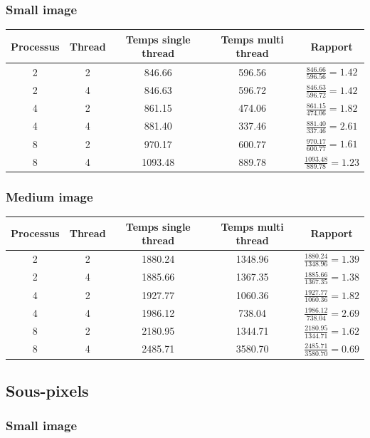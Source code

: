 \documentclass{article}
\begin{document}
\subsubsection{Small image}

\begin{tabular}{ | c | c | c | c | c | }
  \hline
  Processus & Thread & Temps single thread & Temps multi thread & Rapport \\
  \hline
  2 & 2 & 846.66 & 596.56 & $ \frac{846.66}{596.56} = 1.42 $ \\
  2 & 4 & 846.63 & 596.72 & $ \frac{846.63}{596.72} = 1.42 $ \\
  4 & 2 & 861.15 & 474.06 & $ \frac{861.15}{474.06} = 1.82 $ \\
  4 & 4 & 881.40 & 337.46 & $ \frac{881.40}{337.46} = 2.61 $ \\
  8 & 2 & 970.17 & 600.77 & $ \frac{970.17}{600.77} = 1.61 $ \\
  8 & 4 & 1093.48 & 889.78 & $ \frac{1093.48}{889.78} = 1.23 $ \\
  \hline
\end{tabular}


\subsubsection{Medium image}

\begin{tabular}{ | c | c | c | c | c | }
  \hline
  Processus & Thread & Temps single thread & Temps multi thread & Rapport \\
  \hline
  2 & 2 & 1880.24 & 1348.96 & $ \frac{1880.24}{1348.96} = 1.39 $ \\
  2 & 4 & 1885.66 & 1367.35 & $ \frac{1885.66}{1367.35} = 1.38 $ \\
  4 & 2 & 1927.77 & 1060.36 & $ \frac{1927.77}{1060.36} = 1.82 $ \\
  4 & 4 & 1986.12 & 738.04 & $ \frac{1986.12}{738.04} = 2.69 $ \\
  8 & 2 & 2180.95 & 1344.71 & $ \frac{2180.95}{1344.71} = 1.62 $ \\
  8 & 4 & 2485.71 & 3580.70 & $ \frac{2485.71}{3580.70} = 0.69 $ \\
  \hline
\end{tabular}


\subsection{Sous-pixels}

\subsubsection{Small image}
\end{document}
